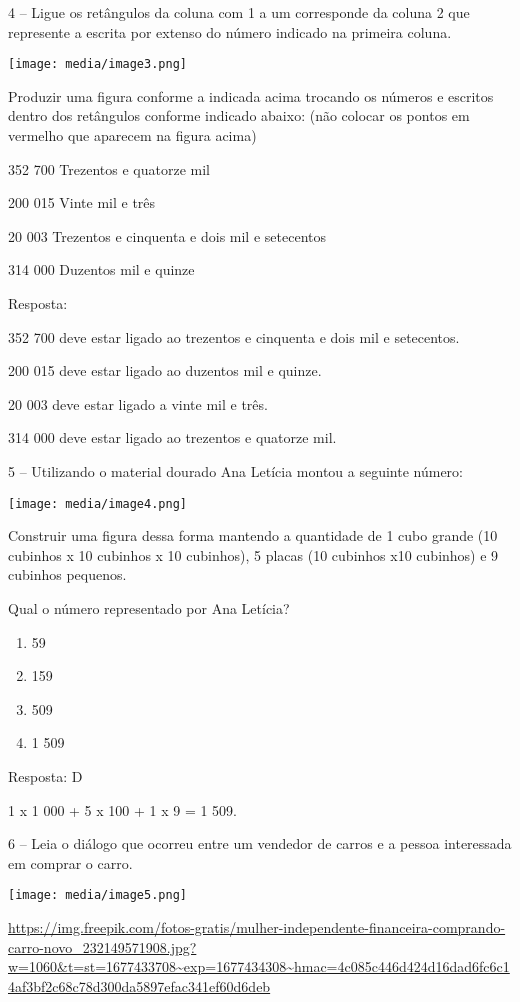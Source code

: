 4 -- Ligue os retângulos da coluna com 1 a um corresponde da coluna 2
que represente a escrita por extenso do número indicado na primeira
coluna.

\texttt{[image: media/image3.png]}

Produzir uma figura conforme a indicada acima trocando os números e
escritos dentro dos retângulos conforme indicado abaixo: (não colocar os
pontos em vermelho que aparecem na figura acima)

352 700 Trezentos e quatorze mil

200 015 Vinte mil e três

20 003 Trezentos e cinquenta e dois mil e setecentos

314 000 Duzentos mil e quinze

Resposta:

352 700 deve estar ligado ao trezentos e cinquenta e dois mil e
setecentos.

200 015 deve estar ligado ao duzentos mil e quinze.

20 003 deve estar ligado a vinte mil e três.

314 000 deve estar ligado ao trezentos e quatorze mil.

5 -- Utilizando o material dourado Ana Letícia montou a seguinte número:

\texttt{[image: media/image4.png]}

Construir uma figura dessa forma mantendo a quantidade de 1 cubo grande
(10 cubinhos x 10 cubinhos x 10 cubinhos), 5 placas (10 cubinhos x10
cubinhos) e 9 cubinhos pequenos.

Qual o número representado por Ana Letícia?

\begin{enumerate}
\def\labelenumi{\alph{enumi})}
\item
  59
\item
  159
\item
  509
\item
  1 509
\end{enumerate}

Resposta: D

1 x 1 000 + 5 x 100 + 1 x 9 = 1 509.

6 -- Leia o diálogo que ocorreu entre um vendedor de carros e a pessoa
interessada em comprar o carro.

\texttt{[image: media/image5.png]}

\url{https://img.freepik.com/fotos-gratis/mulher-independente-financeira-comprando-carro-novo_232149571908.jpg?w=1060\&t=st=1677433708~exp=1677434308~hmac=4c085c446d424d16dad6fc6c14af3bf2c68c78d300da5897efac341ef60d6deb}

